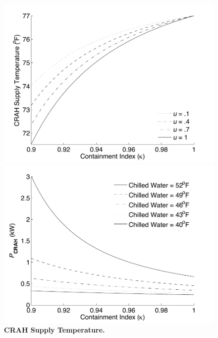 \begin{figure}[ht]


\begin{minipage}[b]{0.5\linewidth}
  \centering
  \includegraphics[width = \linewidth]{Appendices/WEED/figure/AirFlow1CRAHSupply.pdf}
  \caption{ \textbf{ CRAH Supply Temperature. } }
  \label{figure::AirFlow}
\end{minipage}
\begin{minipage}[b]{0.5\linewidth}
\centering
  \includegraphics[width = \linewidth]{Appendices/WEED/figure/CRAH1CI.pdf}

\end{minipage}
\end{figure}
